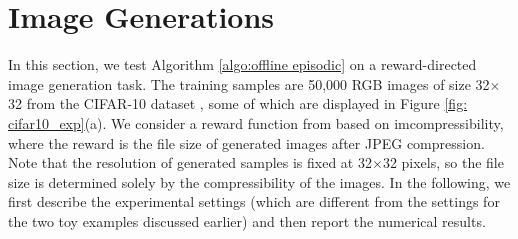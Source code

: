 \documentclass[11pt]{article}
\begin{document}
\section{Image Generations}\label{sec:image}
In this section, we test Algorithm \ref{algo:offline episodic}  on a reward-directed image generation task. The training samples are 50,000 RGB images of size 32$\times$32 from the CIFAR-10 dataset \citep{krizhevsky2009learning},  some of which are displayed in Figure \ref{fig: cifar10_exp}(a). We consider a reward function from \cite{black2023training} based on imcompressibility, where the reward is the file size of generated images after JPEG compression. Note that the resolution of generated samples is fixed at 32$\times$32 pixels, so the file size is determined solely by the compressibility of the images.
In the following, we first describe the experimental settings (which are different from the settings for the two toy examples discussed earlier) and then report the numerical results.
\end{document}
